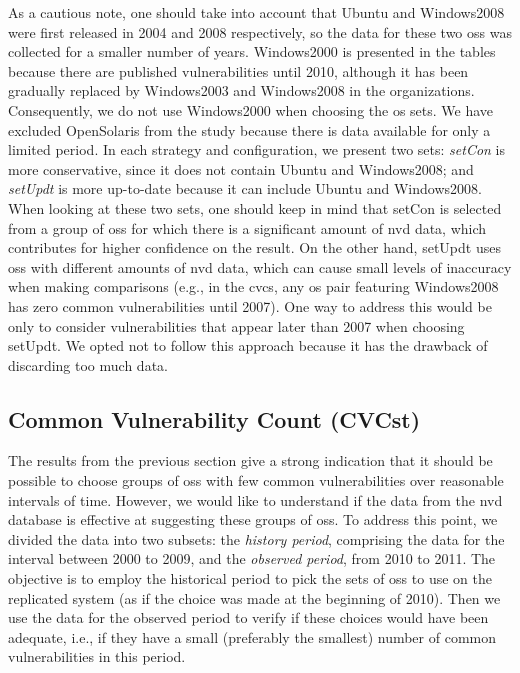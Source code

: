As a cautious note, one should take into account that Ubuntu and Windows2008 were first released in 2004 and 2008 respectively, so the data for these two \glspl{os} was collected for a smaller number of years. 
Windows2000 is presented in the tables because there are published vulnerabilities until 2010, although it has been gradually replaced by Windows2003 and Windows2008 in the organizations. Consequently, we do not use Windows2000 when choosing the \gls{os} sets. 
We have excluded OpenSolaris from the study because there is data available for only a limited period. 
In each strategy and configuration, we present two sets: \emph{setCon} is more conservative, since it does not contain Ubuntu and Windows2008; and \emph{setUpdt} is more up-to-date because it can include Ubuntu and Windows2008. 
When looking at these two sets, one should keep in mind that setCon is selected from a group of \glspl{os} for which there is a significant amount of \gls{nvd} data, which contributes for higher confidence on the result. 
On the other hand, setUpdt uses \glspl{os} with different amounts of \gls{nvd} data, which can cause small levels of inaccuracy when making comparisons (e.g., in the \gls{cvcs}, any \gls{os} pair featuring Windows2008 has zero common vulnerabilities until 2007). 
One way to address this would be only to consider vulnerabilities that appear later than 2007 when choosing setUpdt. 
We opted not to follow this approach because it has the drawback of discarding too much data.


\subsection{Common Vulnerability Count (CVCst)} 

The results from the previous section give a strong indication that it should be possible to choose groups of \glspl{os} with few common vulnerabilities over reasonable intervals of time. 
However, we would like to understand if the data from the \gls{nvd} database is effective at suggesting these groups of \glspl{os}. 
To address this point, we divided the data into two subsets: the \emph{history period}, comprising the data for the interval between 2000 to 2009, and the \emph{observed period}, from 2010 to 2011. 
The objective is to employ the historical period to pick the sets of \glspl{os} to use on the replicated system (as if the choice was made at the beginning of 2010). Then we use the data for the observed period to verify if these choices would have been adequate, i.e., if they have a small (preferably the smallest) number of common vulnerabilities in this period.

